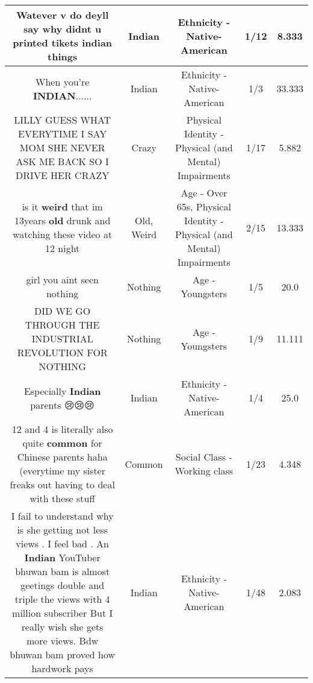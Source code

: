 \documentclass[11pt]{article}
\newlength\mylength
\begin{document}
\begin{center}
\begin{longtable}{|C{.65\mylength}|C{.30\mylength}|C{.12\mylength}|C{.12\mylength}|C{.12\mylength}|}
  \small Watever v do deyll say why didnt u printed tikets \textbf{indian} things\normalsize   & Indian & Ethnicity - Native-American & 1/12 & 8.333 \\  \hline
  \small When you're \textbf{INDIAN}......\normalsize   & Indian & Ethnicity - Native-American & 1/3 & 33.333 \\  \hline
  \small LILLY GUESS WHAT EVERYTIME I SAY MOM SHE NEVER ASK ME BACK SO I DRIVE HER CRAZY\normalsize   & Crazy & Physical Identity - Physical (and Mental) Impairments & 1/17 & 5.882 \\  \hline
  \small is it \textbf{weird} that im 13years \textbf{old} drunk and watching these video at 12 night\normalsize   & Old, Weird & Age - Over 65s, Physical Identity - Physical (and Mental) Impairments & 2/15 & 13.333 \\  \hline
  \small girl you aint seen nothing\normalsize   & Nothing & Age - Youngsters & 1/5 & 20.0 \\  \hline
  \small DID WE GO THROUGH THE INDUSTRIAL REVOLUTION FOR NOTHING\normalsize   & Nothing & Age - Youngsters & 1/9 & 11.111 \\  \hline
  \small Especially \textbf{Indian} parents 😢😢😢\normalsize   & Indian & Ethnicity - Native-American & 1/4 & 25.0 \\  \hline
  \small 12 and 4 is literally also quite \textbf{common} for Chinese parents haha (everytime my sister freaks out having to deal with these stuff\normalsize   & Common & Social Class - Working class & 1/23 & 4.348 \\  \hline
  \small I fail to understand why is she getting not less views . I feel bad . An \textbf{Indian} YouTuber bhuwan bam is almost geetings double and triple the views with 4 million subscriber But I really wish she gets more views. Bdw bhuwan bam proved how hardwork pays\normalsize   & Indian & Ethnicity - Native-American & 1/48 & 2.083 \\  \hline

\end{longtable}
\end{center}
\end{document}
